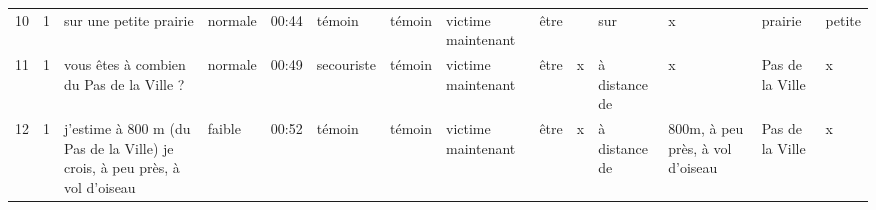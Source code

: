 \begin{landscape}
\begin{longtable}{>{\tiny}r>{\tiny}r>{\tiny}p{2.5cm}>{\tiny}l>{\tiny}l>{\tiny}l>{\tiny}l>{\tiny}p{1.5cm}>{\tiny}l>{\tiny}p{1.5cm}>{\tiny}p{1.5cm}>{\tiny}p{1.5cm}>{\tiny}p{1.5cm}>{\tiny}p{1.5cm}}
    10&1&sur une petite prairie&normale&00:44&témoin&témoin&victime maintenant&être&&sur&x&prairie&petite\\
    11&1&vous êtes à combien du Pas de la Ville ?&normale&00:49&secouriste&témoin&victime maintenant&être&x&à distance de&x&Pas de la Ville&x\\
    12&1&j'estime à 800 m (du Pas de la Ville) je crois, à peu près, à vol d'oiseau&faible&00:52&témoin&témoin&victime maintenant&être&x&à distance de&800m, à peu près, à vol d'oiseau&Pas de la Ville&x\\  
    \bottomrule
  \end{longtable}
  \label{tab:ds}
\end{landscape}